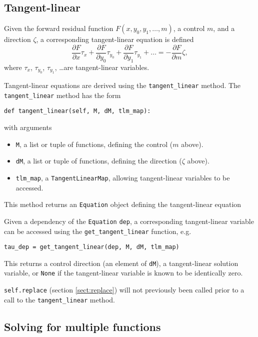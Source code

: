 \documentclass[11pt]{article}
\begin{document}
\subsection{Tangent-linear}\label{sect:tangent_linear}

Given the forward residual function $F \left( x, y_0, y_1, \ldots, m \right)$,
a control $m$, and a direction $\zeta$, a corresponding tangent-linear equation
is defined
\begin{equation*}
  \frac{\partial F}{\partial x} \tau_x
    + \frac{\partial F}{\partial y_0} \tau_{y_0}
    + \frac{\partial F}{\partial y_1} \tau_{y_1}
    + \ldots = -\frac{\partial F}{\partial m} \zeta,
\end{equation*}
where $\tau_x$, $\tau_{y_0}$, $\tau_{y_1}$, \ldots are tangent-linear
variables.

Tangent-linear equations are derived using the \texttt{tangent\_linear} method.
The \texttt{tangent\_linear} method has the form
\begin{lstlisting}
def tangent_linear(self, M, dM, tlm_map):
\end{lstlisting}
with arguments
\begin{itemize}
  \item \texttt{M}, a list or tuple of functions, defining the
    control ($m$ above).
  \item \texttt{dM}, a list or tuple of functions, defining the direction
    ($\zeta$ above).
  \item \texttt{tlm\_map}, a \texttt{TangentLinearMap}, allowing tangent-linear
    variables to be accessed.
\end{itemize}
This method returns an \texttt{Equation} object defining the tangent-linear
equation

Given a dependency of the \texttt{Equation} \texttt{dep}, a corresponding
tangent-linear variable can be accessed using the \texttt{get\_tangent\_linear}
function, e.g.
\begin{lstlisting}
tau_dep = get_tangent_linear(dep, M, dM, tlm_map)
\end{lstlisting}
This returns a control direction (an element of \texttt{dM}), a tangent-linear
solution variable, or \texttt{None} if the tangent-linear variable is known to
be identically zero.

\texttt{self.replace} (section \ref{sect:replace}) will not previously been
called prior to a call to the \texttt{tangent\_linear} method.

\subsection{Solving for multiple functions}
\end{document}
